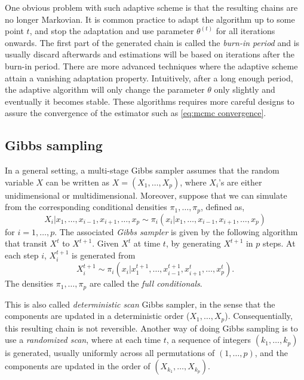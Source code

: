One obvious problem with such adaptive scheme is that the resulting chains are
no longer Markovian. It is common practice to adapt the algorithm up to some
point $t$, and stop the adaptation and use parameter $\theta^{(t)}$ for all
iterations onwards. The first part of the generated chain is called the
\emph{burn-in period} and is usually discard afterwards and estimations will
be based on iterations after the burn-in period. There are more advanced
techniques where the adaptive scheme attain a vanishing adaptation property.
Intuitively, after a long enough period, the adaptive algorithm will only
change the parameter $\theta$ only slightly and eventually it becomes stable.
These algorithms requires more careful designs to assure the convergence of
the estimator such as \eqref{eq:mcmc convergence}.

\subsection{Gibbs sampling}
\label{sub:Gibbs sampling}

In a general setting, a multi-stage Gibbs sampler assumes that the random
variable $X$ can be written as $X = (X_1,\dots,X_p)$, where $X_i$'s are either
unidimensional or multidimensional. Moreover, suppose that we can simulate
from the corresponding conditional densities $\pi_1,\dots,\pi_p$, defined as,
\begin{equation}
  X_i|x_1,\dots,x_{i-1},x_{i+1},\dots,x_p
  \sim \pi_i(x_i|x_1,\dots,x_{i-1},x_{i+1},\dots,x_p)
\end{equation}
for $i = 1,\dots,p$. The associated \emph{Gibbs sampler} is given by the
following algorithm that transit $X^t$ to $X^{t+1}$. Given $X^t$ at time $t$,
by generating $X^{t+1}$ in $p$ steps. At each step $i$, $X_i^{t+1}$ is
generated from
\begin{equation}
  X_i^{t+1} \sim
  \pi_i(x_i|x_1^{t+1},\dots,x_{i-1}^{t+1},x_{i+1}^t,\dots,x_p^t).
\end{equation}
The densities $\pi_1,\dots,\pi_p$ are called the \emph{full conditionals}.

This is also called \emph{deterministic scan} Gibbs sampler, in the sense that
the components are updated in a deterministic order ($X_1,\dots,X_p$).
Consequentially, this resulting chain is not reversible. Another way of doing
Gibbs sampling is to use a \emph{randomized scan}, where at each time $t$, a
sequence of integers $(k_1,\dots,k_p)$ is generated, usually uniformly across
all permutations of $(1,\dots,p)$, and the components are updated in the order
of $(X_{k_1},\dots,X_{k_p})$.

